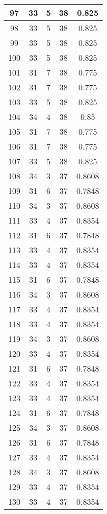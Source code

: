 \documentclass[letterpaper, 12pt]{article}
\begin{document}
\begin{longtable}{|c|c|c|c|c|}
\hline
97 & 33 & 5 & 38 & 0.825 \\
\hline
98 & 33 & 5 & 38 & 0.825 \\
\hline
99 & 33 & 5 & 38 & 0.825 \\
\hline
100 & 33 & 5 & 38 & 0.825 \\
\hline
101 & 31 & 7 & 38 & 0.775 \\
\hline
102 & 31 & 7 & 38 & 0.775 \\
\hline
103 & 33 & 5 & 38 & 0.825 \\
\hline
104 & 34 & 4 & 38 & 0.85 \\
\hline
105 & 31 & 7 & 38 & 0.775 \\
\hline
106 & 31 & 7 & 38 & 0.775 \\
\hline
107 & 33 & 5 & 38 & 0.825 \\
\hline
108 & 34 & 3 & 37 & 0.8608 \\
\hline
109 & 31 & 6 & 37 & 0.7848 \\
\hline
110 & 34 & 3 & 37 & 0.8608 \\
\hline
111 & 33 & 4 & 37 & 0.8354 \\
\hline
112 & 31 & 6 & 37 & 0.7848 \\
\hline
113 & 33 & 4 & 37 & 0.8354 \\
\hline
114 & 33 & 4 & 37 & 0.8354 \\
\hline
115 & 31 & 6 & 37 & 0.7848 \\
\hline
116 & 34 & 3 & 37 & 0.8608 \\
\hline
117 & 33 & 4 & 37 & 0.8354 \\
\hline
118 & 33 & 4 & 37 & 0.8354 \\
\hline
119 & 34 & 3 & 37 & 0.8608 \\
\hline
120 & 33 & 4 & 37 & 0.8354 \\
\hline
121 & 31 & 6 & 37 & 0.7848 \\
\hline
122 & 33 & 4 & 37 & 0.8354 \\
\hline
123 & 33 & 4 & 37 & 0.8354 \\
\hline
124 & 31 & 6 & 37 & 0.7848 \\
\hline
125 & 34 & 3 & 37 & 0.8608 \\
\hline
126 & 31 & 6 & 37 & 0.7848 \\
\hline
127 & 33 & 4 & 37 & 0.8354 \\
\hline
128 & 34 & 3 & 37 & 0.8608 \\
\hline
129 & 33 & 4 & 37 & 0.8354 \\
\hline
130 & 33 & 4 & 37 & 0.8354 \\

\end{longtable}
\end{document}
